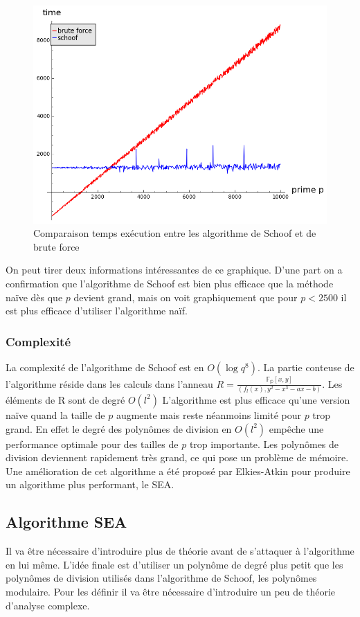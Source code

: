 \documentclass{article}
\begin{document}
\begin{figure}[h!]
\caption{Comparaison temps exécution entre les algorithme de Schoof et de brute force}
\includegraphics[scale=0.6]{pictures/schoof_vs_bruteforce.png} 
\end{figure}
On peut tirer deux informations intéressantes de ce graphique. D'une part on a confirmation que l'algorithme de Schoof est bien plus efficace que la méthode naïve dès que $p$ devient grand, mais on voit graphiquement que pour $p<2500$ il est plus efficace d'utiliser l'algorithme naïf.
\newpage
\subsubsection{Complexité}
La complexité de l'algorithme de Schoof est en $O(\log{q}^8)$. La partie conteuse de l'algorithme réside dans les calculs dans l'anneau $R = \frac{\mathbb{F_p}[x,y]}{(f_l(x), y^2 -x^3 -ax -b)}$. Les éléments de R sont de degré $O(l^2)$ 
\newline
 L'algorithme est plus efficace qu'une version naïve quand la taille de $p$ augmente mais reste néanmoins limité pour $p$ trop grand. En effet le degré des polynômes de division en $O(l^2)$ empêche une performance optimale pour des tailles de $p$ trop importante. Les polynômes de division deviennent rapidement très grand, ce qui pose un problème de mémoire. Une amélioration de cet algorithme a été proposé par Elkies-Atkin pour produire un algorithme plus performant, le SEA. 
 
\subsection{Algorithme SEA}
Il va être nécessaire d'introduire plus de théorie avant de s'attaquer à l'algorithme en lui même. L'idée finale est d'utiliser un polynôme de degré plus petit que les polynômes de division utilisés dans l'algorithme de Schoof, les polynômes modulaire. Pour les définir il va être nécessaire d'introduire un peu de théorie d'analyse complexe.
\end{document}
